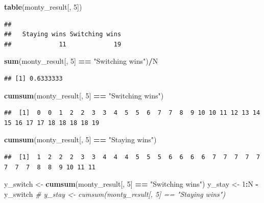 \documentclass[
]{article}
\newenvironment{Shaded}{\begin{snugshade}}{\end{snugshade}}
\newcommand{\CommentTok}[1]{\textcolor[rgb]{0.56,0.35,0.01}{\textit{#1}}}
\newcommand{\DecValTok}[1]{\textcolor[rgb]{0.00,0.00,0.81}{#1}}
\newcommand{\KeywordTok}[1]{\textcolor[rgb]{0.13,0.29,0.53}{\textbf{#1}}}
\newcommand{\NormalTok}[1]{#1}
\newcommand{\OperatorTok}[1]{\textcolor[rgb]{0.81,0.36,0.00}{\textbf{#1}}}
\newcommand{\StringTok}[1]{\textcolor[rgb]{0.31,0.60,0.02}{#1}}
\begin{document}
\begin{Shaded}
\begin{Highlighting}[]
\KeywordTok{table}\NormalTok{(monty_result[, }\DecValTok{5}\NormalTok{])}
\end{Highlighting}
\end{Shaded}

\begin{verbatim}
## 
##   Staying wins Switching wins 
##             11             19
\end{verbatim}

\begin{Shaded}
\begin{Highlighting}[]
\KeywordTok{sum}\NormalTok{(monty_result[, }\DecValTok{5}\NormalTok{] }\OperatorTok{==}\StringTok{ "Switching wins"}\NormalTok{)}\OperatorTok{/}\NormalTok{N}
\end{Highlighting}
\end{Shaded}

\begin{verbatim}
## [1] 0.6333333
\end{verbatim}

\begin{Shaded}
\begin{Highlighting}[]
\KeywordTok{cumsum}\NormalTok{(monty_result[, }\DecValTok{5}\NormalTok{] }\OperatorTok{==}\StringTok{ "Switching wins"}\NormalTok{)}
\end{Highlighting}
\end{Shaded}

\begin{verbatim}
##  [1]  0  0  1  2  2  3  3  4  5  5  6  7  7  8  9 10 10 11 12 13 14 15 16 17 17 18 18 18 18 19
\end{verbatim}

\begin{Shaded}
\begin{Highlighting}[]
\KeywordTok{cumsum}\NormalTok{(monty_result[, }\DecValTok{5}\NormalTok{] }\OperatorTok{==}\StringTok{ "Staying wins"}\NormalTok{)}
\end{Highlighting}
\end{Shaded}

\begin{verbatim}
##  [1]  1  2  2  2  3  3  4  4  4  5  5  5  6  6  6  6  7  7  7  7  7  7  7  7  8  8  9 10 11 11
\end{verbatim}

\begin{Shaded}
\begin{Highlighting}[]
\NormalTok{y_switch <-}\StringTok{ }\KeywordTok{cumsum}\NormalTok{(monty_result[, }\DecValTok{5}\NormalTok{] }\OperatorTok{==}\StringTok{ "Switching wins"}\NormalTok{)}
\NormalTok{y_stay <-}\StringTok{ }\DecValTok{1}\OperatorTok{:}\NormalTok{N }\OperatorTok{-}\StringTok{ }\NormalTok{y_switch}
\CommentTok{# y_stay <- cumsum(monty_result[, 5] == "Staying wins")}
\end{Highlighting}
\end{Shaded}
\end{document}
